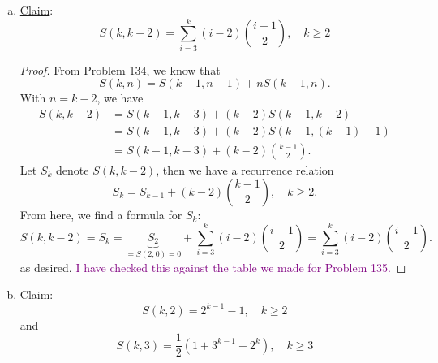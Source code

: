 \documentclass[11pt]{article}
\newcommand{\f}[2]{\frac{#1}{#2}}
\begin{document}
\begin{enumerate}[(a)]
	\item \underline{Claim}:
	\begin{equation*}
	\boxed{S(k,k-2) = \sum^k_{i=3} (i-2) { {i-1} \choose  2  }, \quad k\geq 2}
	\end{equation*}
	
	\begin{proof}
		From Problem 134, we know that 
		\begin{equation*}
		S(k,n) = S(k-1, n-1) + nS(k-1,n).
		\end{equation*}
		With $n=k-2$, we have
		\begin{align*}
		S(k,k-2) &= S(k-1, k-3) + (k-2)S(k-1,k-2)\\
		&= S(k-1, k-3) + (k-2)S(k-1,(k-1)-1)\\
		&= S(k-1, k-3) + (k-2){{k-1} \choose 2}.
		\end{align*}
		Let $S_k$ denote $S(k,k-2)$, then we have a recurrence relation 
		\begin{equation*}
		S_k = S_{k-1} + (k-2){{k-1} \choose 2}, \quad k \geq 2.
		\end{equation*}
		From here, we find a formula for $S_k$:
		\begin{equation*}
		S(k,k-2) = S_k = \underbrace{S_2}_{= S(2,0) = 0} + \sum^{k}_{i=3} (i-2){{i-1} \choose 2} = \sum^{k}_{i=3} (i-2){{i-1} \choose 2}.
		\end{equation*}
		as desired. \textcolor{purple}{I have checked this against the table we made for Problem 135.}
	\end{proof}
	
	
	\item \underline{Claim}:
	\begin{equation*}
	\boxed{S(k,2) = 2^{k-1}-1, \quad  k\geq 2}
	\end{equation*}
	and 
	\begin{equation*}
	\boxed{S(k,3) = \f{1}{2}(1+3^{k-1}-2^k), \quad   k\geq 3}
	\end{equation*}
	

\end{enumerate}
\end{document}
